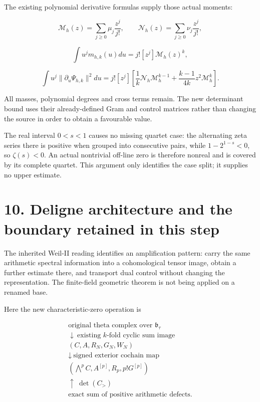 \documentclass[
  11pt,
]{article}
\begin{document}
The existing polynomial derivative formulas supply those actual moments:

\[
\mathcal M_h(z)=\sum_{j\geq0}\mu_j\frac{z^j}{j!},\qquad
\mathcal N_h(z)=\sum_{j\geq0}\nu_j\frac{z^j}{j!},
\]

\[
\int u^j m_{h,k}(u)du=j![z^j]\mathcal M_h(z)^k,
\]

\[
\int u^j\|\partial_u\Psi_{h,k}\|^2du
=j![z^j]\left[
\frac1k\mathcal N_h\mathcal M_h^{k-1}
+\frac{k-1}{4k}z^2\mathcal M_h^k\right].
\]

All masses, polynomial degrees and cross terms remain. The new
determinant bound uses their already-defined Gram and control matrices
rather than changing the source in order to obtain a favourable value.

The real interval \(0<s<1\) causes no missing quartet case: the
alternating zeta series there is positive when grouped into consecutive
pairs, while \(1-2^{1-s}<0\), so \(\zeta(s)<0\). An actual nontrivial
off-line zero is therefore nonreal and is covered by its complete
quartet. This argument only identifies the case split; it supplies no
upper estimate.

\section{10. Deligne architecture and the boundary retained in this
step}\label{deligne-architecture-and-the-boundary-retained-in-this-step}

The inherited Weil-II reading identifies an amplification pattern: carry
the same arithmetic spectral information into a cohomological tensor
image, obtain a further estimate there, and transport dual control
without changing the representation. The finite-field geometric theorem
is not being applied on a renamed base.

Here the new characteristic-zero operation is

\[
\begin{gathered}
\text{original theta complex over }\mathfrak b_\tau\\
\downarrow\ \text{existing }k\text{-fold cyclic sum image}\\
(C,A,R_N,G_N,W_N)\\
\downarrow\ \text{signed exterior cochain map}\\
(\bigwedge^p C,A^{[p]},R_p,p!G^{[p]})\\
\uparrow\ \det(C_{>})\\
\text{exact sum of positive arithmetic defects}.
\end{gathered}
\]
\end{document}
